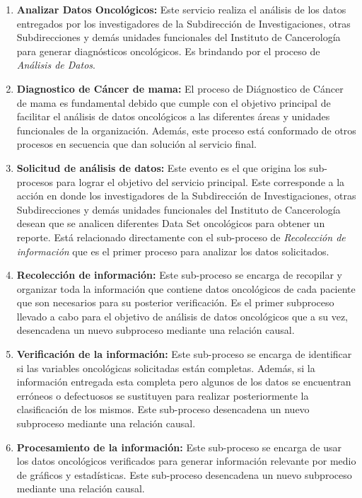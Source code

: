 \begin{enumerate}[label=\textbf{\arabic*})]
	\item  \textbf{Analizar Datos Oncológicos:} Este servicio realiza el análisis de los datos entregados por  los investigadores de la Subdirección de Investigaciones, otras Subdirecciones y demás unidades funcionales del Instituto  de Cancerología para generar diagnósticos oncológicos. Es brindando por el proceso de  \textit{Análisis de Datos}.
	\newpage
	\item  \textbf{Diagnostico de Cáncer de mama:} El proceso de Diágnostico de Cáncer de mama es fundamental debido que cumple con el objetivo principal de facilitar el análisis de datos oncológicos a las diferentes áreas y unidades funcionales de la organización. Además, este proceso está conformado de otros procesos en secuencia que dan solución al servicio final.

	\item  \textbf{Solicitud de análisis de datos:} Este evento es el que origina los sub-procesos para lograr el objetivo del servicio principal. Este corresponde a la acción en donde  los investigadores de la Subdirección de Investigaciones, otras Subdirecciones y demás unidades funcionales del Instituto  de Cancerología desean que se analicen diferentes Data Set oncológicos para obtener un reporte. Está relacionado  directamente con el sub-proceso de \textit{Recolección de información}  que es el primer proceso para analizar los datos solicitados.
	
	\item  \textbf{Recolección de información:} Este sub-proceso se encarga de recopilar y organizar toda la información que contiene datos oncológicos de cada paciente que son necesarios para su posterior verificación. Es el primer subproceso llevado a cabo para el objetivo de análisis de datos oncológicos que a su vez, desencadena un nuevo subproceso mediante una relación causal.
	
	\item  \textbf{Verificación de la información:} Este sub-proceso se encarga de identificar si las variables oncológicas solicitadas están completas. Además, si la información entregada esta completa pero algunos de los datos se encuentran erróneos o defectuosos se sustituyen para realizar posteriormente la clasificación de los mismos. Este sub-proceso desencadena un nuevo subproceso mediante una relación causal.
	
	\item  \textbf{Procesamiento de la información:} Este sub-proceso se encarga de usar los datos oncológicos  verificados para generar información relevante por medio de gráficos y estadísticas. Este sub-proceso desencadena un nuevo subproceso mediante una relación causal.
	

\end{enumerate}
